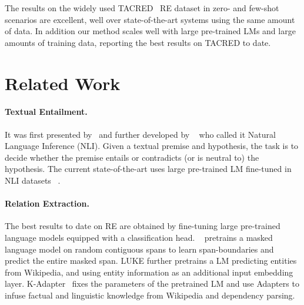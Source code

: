 \documentclass[11pt]{article}
\begin{document}
The results on the widely used TACRED~\cite{zhang2017tacred} RE dataset in zero- and few-shot scenarios are excellent, well over state-of-the-art systems using the same amount of data. In addition our method scales well with large pre-trained LMs and large amounts of training data, reporting the best results on TACRED to date.
















\section{Related Work}
\label{sec:related}

\paragraph{Textual Entailment.} It was first presented by~\citet{10.1007/11736790_9} and further developed by ~\citet{bowman-etal-2015-large} who called it Natural Language Inference (NLI). Given a textual premise and hypothesis, the task is to decide whether the premise entails or contradicts (or is neutral to) the  hypothesis. The current state-of-the-art uses large pre-trained LM fine-tuned in NLI datasets~ \cite{Lan2020ALBERT:,roberta, conneau-etal-2020-unsupervised, lewis-etal-2020-bart, deberta}.




\paragraph{Relation Extraction.} The best results to date on RE are obtained by fine-tuning large pre-trained language models equipped with a classification head. ~\citet{joshi-etal-2020-spanbert} pretrains a masked language model on random contiguous spans to learn span-boundaries and predict the entire masked span. LUKE \cite{yamada-etal-2020-luke} further pretrains a LM predicting entities from Wikipedia, and  using entity information as an additional input embedding layer. K-Adapter~\cite{wang2020kadapter} fixes the parameters of the pretrained LM and use Adapters to infuse factual and linguistic knowledge from Wikipedia and dependency parsing.
\end{document}
